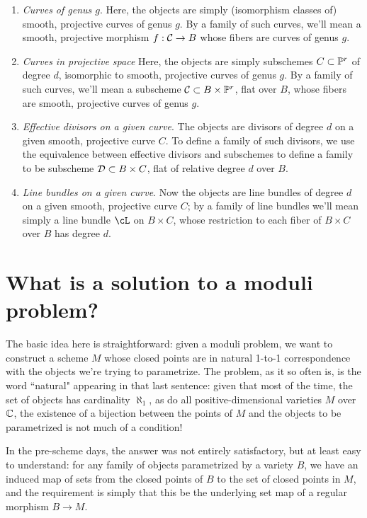 \begin{enumerate}
\item \emph{Curves of genus $g$}. Here, the objects are simply (isomorphism classes of) smooth, projective curves of genus $g$. By a family of such curves, we'll mean a smooth, projective morphism $f : \cC \to B$ whose fibers are  curves of genus $g$.

\item \emph{Curves in projective space} Here, the objects are simply subschemes $C \subset \PP^r$ of degree $d$, isomorphic to smooth, projective curves of genus $g$. By a family of such curves, we'll mean a subscheme $\cC \subset B \times \PP^r$, flat over $B$,  whose fibers are smooth, projective curves of genus $g$.

\item \emph{Effective divisors on a given curve}. The objects are divisors of degree $d$ on a given smooth, projective curve $C$. To define a family of such divisors, we use the equivalence between effective divisors and subschemes to define a family to be subscheme $\cD \subset B \times C$, flat of relative degree $d$ over $B$.


\item \emph{Line bundles on a given curve}. Now the objects are line bundles of degree $d$ on a given smooth, projective curve $C$; by a family of line bundles we'll mean simply a line bundle $\cL$ on $B \times C$, whose restriction to each fiber of $B \times C$ over $B$ has degree $d$.

\end{enumerate}

\section{What is a solution to a moduli problem?}

The basic idea here is straightforward: given a moduli problem, we want to construct a scheme $M$ whose closed points are in natural  1-to-1 correspondence with the objects we're trying to parametrize. The problem, as it so often is, is the word ``natural" appearing in that last sentence: given that most of the time, the set of objects has cardinality $\aleph_1$, as do all positive-dimensional varieties $M$ over $\CC$, the existence of a bijection between the points of $M$ and the objects to be parametrized is not much of a condition!

In the pre-scheme days, the answer was not entirely satisfactory, but at least easy to understand:  for any family of objects parametrized by a variety $B$, we have an induced map of sets from the closed points of $B$ to the set of closed points in $M$, and the requirement is simply that this be the underlying set map of a regular morphism $B \to M$.

